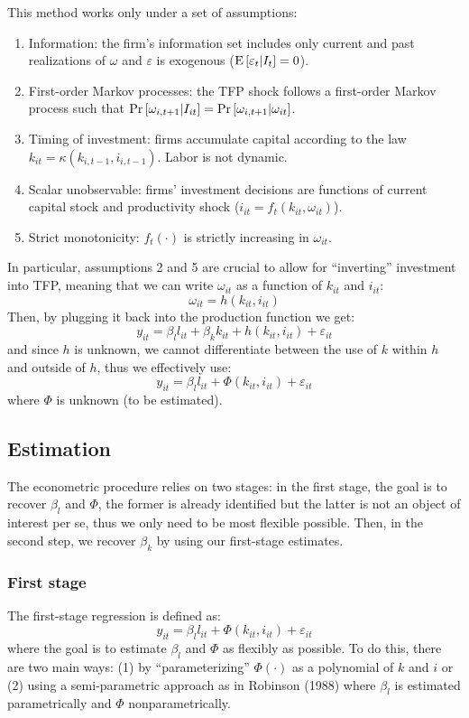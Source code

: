 This method works only under a set of assumptions:\begin{enumerate}
\item Information: the firm's information set includes only current and past realizations of $\omega$ and $\varepsilon$ is exogenous ($\operatorname{E}\left[\varepsilon_t|I_t\right] = 0$).
\item First-order Markov processes: the TFP shock follows a first-order Markov process such that $\operatorname{Pr}\left[\omega_{i,t+1}|I_{it}\right] = \operatorname{Pr}\left[\omega_{i,t+1}|\omega_{it}\right]$.
\item Timing of investment: firms accumulate capital according to the law $k_{it} = \kappa(k_{i,t-1}, i_{i,t-1})$. Labor is not dynamic.
\item Scalar unobservable: firms' investment decisions are functions of current capital stock and productivity shock ($i_{it} = f_t(k_{it}, \omega_{it})$).
\item Strict monotonicity: $f_t(\cdot)$ is strictly increasing in $\omega_{it}$.
\end{enumerate}

In particular, assumptions 2 and 5 are crucial to allow for ``inverting'' investment into TFP, meaning that we can write $\omega_{it}$ as a function of $k_{it}$ and $i_{it}$: $$\omega_{it} = h(k_{it}, i_{it}) $$
Then, by plugging it back into the production function we get: $$ y_{it} = \beta_l l_{it} +  \beta_k k_{it} + h(k_{it}, i_{it})+ \varepsilon_{it} $$ and since $h$ is unknown, we cannot differentiate between the use of $k$ within $h$ and outside of $h$, thus we effectively use: $$y_{it} = \beta_l l_{it} + \Phi(k_{it}, i_{it})+ \varepsilon_{it} $$ where $\Phi$ is unknown (to be estimated).

\subsection{Estimation}

The econometric procedure relies on two stages: in the first stage, the goal is to recover $\beta_l$ and $\Phi$, the former is already identified but the latter is not an object of interest per se, thus we only need to be most flexible possible. Then, in the second step, we recover $\beta_k$ by using our first-stage estimates.

\subsubsection{First stage}

The first-stage regression is defined as: $$y_{it} = \beta_l l_{it} + \Phi(k_{it}, i_{it})+ \varepsilon_{it} $$ where the goal is to estimate $\beta_l$ and $\Phi$ as flexibly as possible. To do this, there are two main ways: (1) by ``parameterizing'' $\Phi(\cdot)$ as a polynomial of $k$ and $i$ or (2) using a semi-parametric approach as in Robinson (1988) where $\beta_l$ is estimated parametrically and $\Phi$ nonparametrically.

